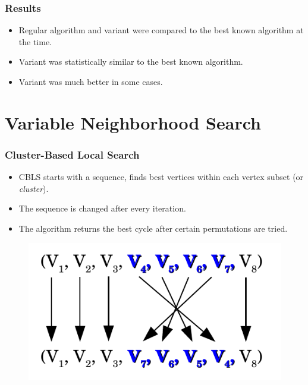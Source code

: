 \documentclass{beamer}
\begin{document}
\begin{frame}
\frametitle{Results}
\begin{itemize}
	\item Regular algorithm and variant were compared to the best known algorithm at the time. 
	\item Variant was statistically similar to the best known algorithm. 
	\item Variant was much better in some cases. 
\end{itemize}
\end{frame}


\section[Variable Neighborhood Search]{Variable Neighborhood Search}

\begin{frame}
\frametitle{Cluster-Based Local Search}
	\begin{itemize}
	\item CBLS starts with a sequence, finds best vertices within each vertex subset (or \textit{cluster}).
	\item The sequence is changed after every iteration. 
	\item The algorithm returns the best cycle after certain permutations are tried. 
	\end{itemize}
\begin{figure}
	\centering
	\includegraphics[scale=0.8]{CBLSExample.pdf}
\end{figure}

\end{frame}
\end{document}

